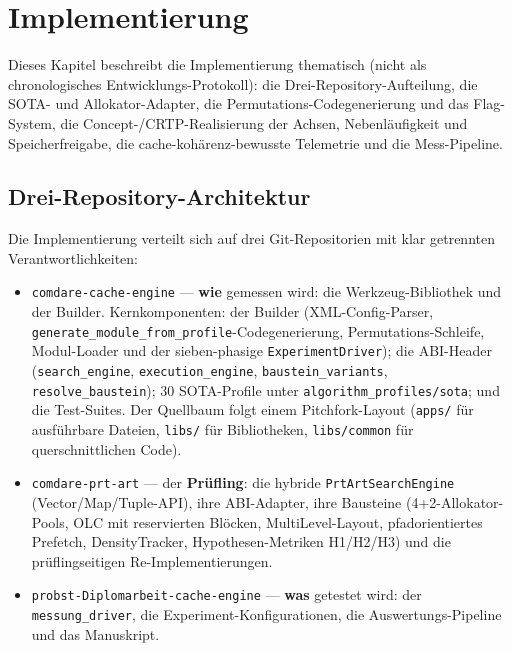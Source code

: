 \chapter{Implementierung}\label{ch:impl}

Dieses Kapitel beschreibt die Implementierung thematisch (nicht als chronologisches
Entwicklungs-Protokoll): die Drei-Repository-Aufteilung, die SOTA- und Allokator-Adapter, die
Permutations-Codegenerierung und das Flag-System, die Concept-/CRTP-Realisierung der Achsen,
Nebenläufigkeit und Speicherfreigabe, die cache-kohärenz-bewusste Telemetrie und die Mess-Pipeline.

\section{Drei-Repository-Architektur}\label{sec:repos}

Die Implementierung verteilt sich auf drei Git-Repositorien mit klar getrennten
Verantwortlichkeiten:

\begin{itemize}
  \item \texttt{comdare-cache-engine} --- \textbf{wie} gemessen wird: die Werkzeug-Bibliothek und
  der Builder. Kernkomponenten: der Builder (XML-Config-Parser,
  \texttt{generate\_\allowbreak{}module\_\allowbreak{}from\_\allowbreak{}profile}-Codegenerierung,
  Permutations-Schleife, Modul-Loader und der sieben-phasige \texttt{Experiment\allowbreak{}Driver});
  die ABI-Header (\texttt{search\_\allowbreak{}engine}, \texttt{execution\_\allowbreak{}engine},
  \texttt{baustein\_\allowbreak{}variants}, \texttt{resolve\_\allowbreak{}baustein}); 30 SOTA-Profile
  unter \texttt{algorithm\_\allowbreak{}profiles/\allowbreak{}sota}; und die Test-Suites. Der
  Quellbaum folgt einem Pitchfork-Layout (\texttt{apps/} für ausführbare Dateien, \texttt{libs/} für
  Bibliotheken, \texttt{libs/common} für querschnittlichen Code).
  \item \texttt{comdare-prt-art} --- der \textbf{Prüfling}: die hybride \texttt{PrtArtSearchEngine}
  (Vector/Map/Tuple-API), ihre ABI-Adapter, ihre Bausteine (4+2-Allokator-Pools, OLC mit
  reservierten Blöcken, MultiLevel-Layout, pfadorientiertes Prefetch, DensityTracker,
  Hypothesen-Metriken H1/H2/H3) und die prüflingseitigen Re-Implementierungen.
  \item \texttt{probst-Diplomarbeit-cache-engine} --- \textbf{was} getestet wird: der
  \texttt{messung\_driver}, die Experiment-Konfigurationen, die Auswertungs-Pipeline und das
  Manuskript.
\end{itemize}

